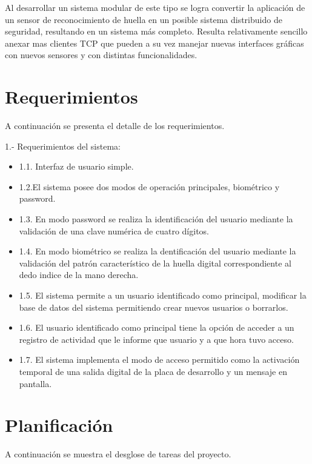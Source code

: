 
Al desarrollar un sistema modular de este tipo se logra convertir la aplicación de un sensor de reconocimiento de huella en un posible sistema distribuido de seguridad, resultando en un sistema más completo. Resulta relativamente sencillo anexar mas clientes TCP que pueden a su vez manejar nuevas interfaces gráficas con nuevos sensores y con distintas funcionalidades.

\section{Requerimientos}
A continuación se presenta el detalle de los requerimientos.

1.- Requerimientos del sistema:

\begin{itemize}
\item 1.1. Interfaz de usuario simple.	
\item 1.2.El sistema posee dos modos de operación principales, biométrico y password.
\item 1.3. En modo password se realiza la identificación del usuario mediante la validación de una clave numérica de cuatro dígitos.
\item 1.4. En modo biométrico se realiza la dentificación del usuario mediante la validación del patrón característico de la huella digital correspondiente al dedo indice de la mano derecha.
\item 1.5. El sistema permite a un usuario identificado como principal, modificar la base de datos del sistema permitiendo crear nuevos usuarios o borrarlos.
\item 1.6. El usuario identificado como principal tiene la opción de acceder a un registro de actividad que le informe que usuario y a que hora tuvo acceso.
\item 1.7. El sistema implementa el modo de acceso permitido como la activación temporal de una salida digital de la placa de desarrollo y un mensaje en pantalla.
\end{itemize}

\section{Planificación}
A continuación se muestra el desglose de tareas del proyecto.

